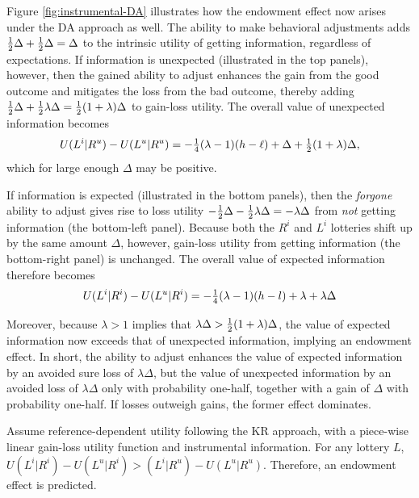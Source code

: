 Figure \ref{fig:instrumental-DA} illustrates how the endowment effect now arises under the DA approach as well. The ability to make behavioral adjustments adds $\tfrac{1}{2} \Delta + \tfrac{1}{2} \Delta = \Delta$ to the intrinsic utility of getting information, regardless of expectations. If information is unexpected (illustrated in the top panels), however, then the gained ability to adjust enhances the gain from the good outcome and mitigates the loss from the bad outcome, thereby adding $\tfrac{1}{2} \Delta + \tfrac{1}{2} \lambda \Delta = \tfrac{1}{2} (1 + \lambda) \Delta$ to gain-loss utility. The overall value of unexpected information becomes
\begin{equation*}
  U(L^i|R^u)-U(L^u|R^u)=-\tfrac{1}{4}(\lambda-1)(h-\ell)+\Delta +\tfrac{1}{2}(1+\lambda)\Delta,
\end{equation*}
which for large enough $\Delta$ may be positive.

If information is expected (illustrated in the bottom panels), then the \emph{forgone} ability to adjust gives rise to loss utility $-\tfrac{1}{2} \Delta - \tfrac{1}{2} \lambda \Delta = -\lambda \Delta$ from \emph{not} getting information (the bottom-left panel). Because both the $R^i$ and $L^i$ lotteries shift up by the same amount $\Delta$, however, gain-loss utility from getting information (the bottom-right panel) is unchanged. The overall value of expected information therefore becomes
\begin{equation*}
  U(L^i|R^i)-U(L^u|R^i)=-\tfrac{1}{4}(\lambda-1)(h-l)+\lambda +\lambda \Delta
\end{equation*}

Moreover, because $\lambda>1$ implies that $\lambda \Delta > \tfrac{1}{2}(1+\lambda)\Delta$, the value of expected information now exceeds that of unexpected information, implying an endowment effect. In short, the ability to adjust enhances the value of expected information by an avoided sure loss of $\lambda \Delta$, but the value of unexpected information by an avoided loss of $\lambda \Delta$ only with probability one-half, together with a gain of $\Delta$ with probability one-half. If losses outweigh gains, the former effect dominates.

\FloatBarrier

\begin{prop}
  Assume reference-dependent utility following the KR approach, with a piece-wise linear gain-loss utility function and instrumental information. For any lottery $L$, $U(L^i|R^i)-U(L^u|R^i)>(L^i|R^u)-U(L^u|R^u)$. Therefore, an endowment effect is predicted.
  \label{prop:instrumental-KR}
\end{prop}

